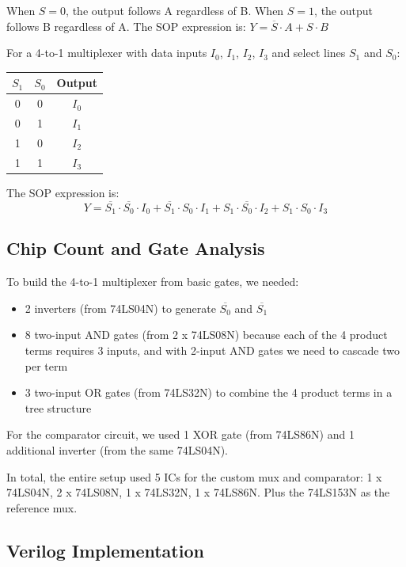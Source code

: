\documentclass[12pt, letterpaper]{article}
\begin{document}
When $S = 0$, the output follows A regardless of B. When $S = 1$, the output follows B regardless of A. The SOP expression is: $Y = \overline{S} \cdot A + S \cdot B$

For a 4-to-1 multiplexer with data inputs $I_0$, $I_1$, $I_2$, $I_3$ and select lines $S_1$ and $S_0$:

\begin{center}
  \begin{tabular}{|cc|c|}
    \hline
    $S_1$ & $S_0$ & Output \\
    \hline
    0 & 0 & $I_0$ \\
    0 & 1 & $I_1$ \\
    1 & 0 & $I_2$ \\
    1 & 1 & $I_3$ \\
    \hline
  \end{tabular}
\end{center}

The SOP expression is:
\[
Y = \overline{S_1} \cdot \overline{S_0} \cdot I_0 + \overline{S_1} \cdot S_0 \cdot I_1 + S_1 \cdot \overline{S_0} \cdot I_2 + S_1 \cdot S_0 \cdot I_3
\]

\subsection{Chip Count and Gate Analysis}

To build the 4-to-1 multiplexer from basic gates, we needed:

\begin{itemize}
  \item 2 inverters (from 74LS04N) to generate $\overline{S_0}$ and $\overline{S_1}$
  \item 8 two-input AND gates (from 2 x 74LS08N) because each of the 4 product terms requires 3 inputs, and with 2-input AND gates we need to cascade two per term
  \item 3 two-input OR gates (from 74LS32N) to combine the 4 product terms in a tree structure
\end{itemize}

For the comparator circuit, we used 1 XOR gate (from 74LS86N) and 1 additional inverter (from the same 74LS04N).

In total, the entire setup used 5 ICs for the custom mux and comparator: 1 x 74LS04N, 2 x 74LS08N, 1 x 74LS32N, 1 x 74LS86N. Plus the 74LS153N as the reference mux.

\subsection{Verilog Implementation}
\end{document}
